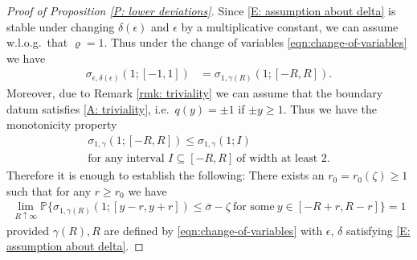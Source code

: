 \documentclass[10pt,a4paper]{amsart}
\begin{document}
\begin{proof}[Proof of Proposition \ref{P: lower deviations}]
	Since \eqref{E: assumption about delta} is stable under changing $ \delta( \epsilon ) $ and $ \epsilon $ by a multiplicative constant, we can assume w.l.o.g.~that $ \varrho = 1 $.
	Thus under the change of variables \eqref{eqn:change-of-variables} we have 
	\begin{align*}
		\sigma_{ \epsilon, \delta ( \epsilon ) } ( 1; [- 1, 1 ] )
		&= \sigma_{ 1 , \gamma ( R ) } ( 1  ; [ - R , R ] ) .
	\end{align*}
	Moreover, due to Remark \ref{rmk: triviality} we can assume that the boundary datum satisfies \eqref{A: triviality}, i.e.~$ q ( y ) = \pm 1 $ if $ \pm y \geq 1 $. Thus we have the monotonicity property
	\begin{gather}
		\sigma_{ 1 , \gamma } ( 1; [ - R , R ] ) \leq \sigma_{ 1 , \gamma } ( 1; I ) \nonumber \\
		 \text{for any interval } I \subseteq [ - R , R ]  ~ \text{of width at least } 2 . \nonumber
	\end{gather}
	Therefore it is enough to establish the following: There exists an $ r_0 = r_0 ( \zeta ) \geq 1 $ such that for any $ r \geq r_0 $ we have
	\begin{align}\label{varm02}
		\lim_{ R \uparrow \infty } \mathbb{P} \big\{  \sigma_{ 1 , \gamma(R) } ( 1;  [ y - r , y + r ] ) \leq \bar\sigma - \zeta ~ \text{for some} ~ y \in [ - R + r , R - r  ] \big\} = 1
	\end{align}
	provided $ \gamma(R), R $ are defined by \eqref{eqn:change-of-variables} with $ \epsilon $, $ \delta $ satisfying \eqref{E: assumption about delta}.
	

\end{proof}
\end{document}
